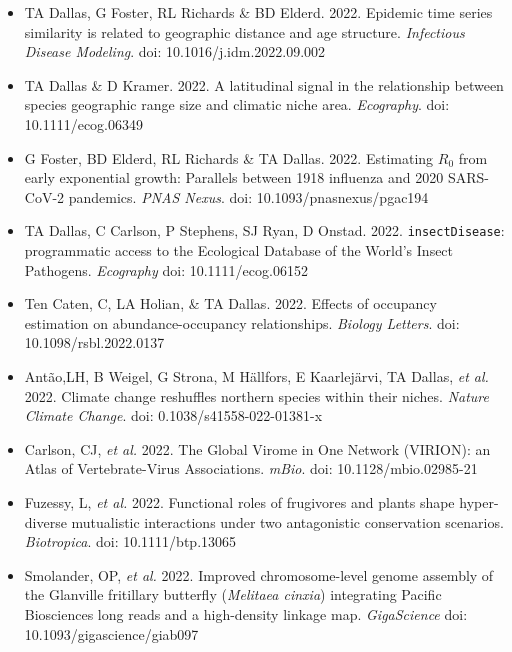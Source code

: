 \documentclass[]{CV}
\begin{document}
{}

\begin{itemize}

  
\item {\mefont TA Dallas}, G Foster, RL Richards \& BD Elderd. 2022. Epidemic time series similarity is related to geographic distance and age structure. \textit{Infectious Disease Modeling}. doi: 10.1016/j.idm.2022.09.002

\item {\mefont TA Dallas} \& D Kramer. 2022. A latitudinal signal in the relationship between species geographic range size and climatic niche area. \textit{Ecography}. doi: 10.1111/ecog.06349


\item G Foster, BD Elderd, RL Richards \& {\mefont TA Dallas}. 2022. Estimating $R_0$ from early exponential growth: Parallels between 1918 influenza and 2020 SARS-CoV-2 pandemics. \textit{PNAS Nexus}. doi: 10.1093/pnasnexus/pgac194

\item {\mefont TA Dallas}, C Carlson, P Stephens, SJ Ryan, D Onstad. 2022. \texttt{insectDisease}: programmatic access to the Ecological Database of the World's Insect Pathogens. \textit{Ecography} doi: 10.1111/ecog.06152

\item Ten Caten, C, LA Holian, \& {\mefont TA Dallas}. 2022. Effects of occupancy estimation on abundance-occupancy relationships. \textit{Biology Letters}. doi: 10.1098/rsbl.2022.0137

\item Antão,LH, B Weigel, G Strona, M Hällfors, E Kaarlejärvi, {\mefont TA Dallas}, \textit{et al.} 2022. Climate change reshuffles northern species within their niches. \textit{Nature Climate Change}. doi: 0.1038/s41558-022-01381-x

\item Carlson, CJ, \textit{et al.} 2022. The Global Virome in One Network (VIRION): an Atlas of Vertebrate-Virus Associations. \textit{mBio}. doi: 10.1128/mbio.02985-21

\item Fuzessy, L, \textit{et al.} 2022. Functional roles of frugivores and plants shape hyper-diverse mutualistic interactions under two antagonistic conservation scenarios. \textit{Biotropica}. doi: 10.1111/btp.13065

\item Smolander, OP, \textit{et al.} 2022. Improved chromosome-level genome assembly of the Glanville fritillary butterfly (\textit{Melitaea cinxia}) integrating Pacific Biosciences long reads and a high-density linkage map. \textit{GigaScience} doi: 10.1093/gigascience/giab097


\end{itemize}
\end{document}
